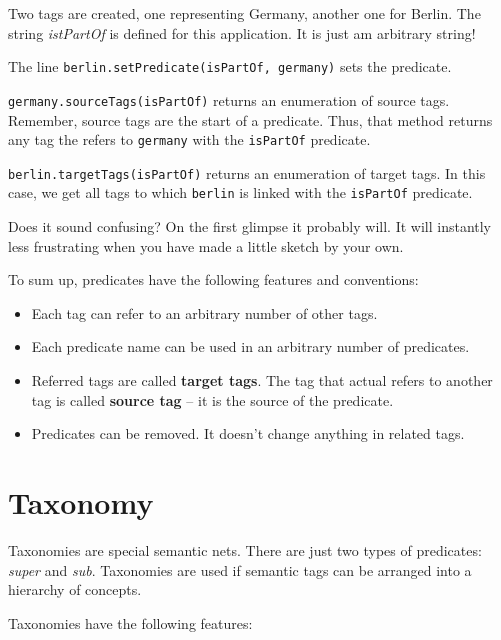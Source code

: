 Two tags are created, one representing Germany, another one for Berlin. The string {\it istPartOf} is defined for this application. It is just am arbitrary string!

The line {\verb|berlin.setPredicate(isPartOf, germany)|} sets the predicate.

{\verb|germany.sourceTags(isPartOf)|} returns an enumeration of source tags.
Remember, source tags are the start of a predicate. Thus, that method returns any tag the refers to {\tt germany} with the {\tt isPartOf} predicate.

{\verb|berlin.targetTags(isPartOf)|} returns an enumeration of target tags.
In this case, we get all tags to which {\tt berlin} is linked with the {\tt isPartOf} predicate.

Does it sound confusing? On the first glimpse it probably will. It will instantly less frustrating when you have made a little sketch by your own.

To sum up, predicates have the following features and conventions:

\begin{itemize}

\item Each tag can refer to an arbitrary number of other tags.

\item
Each predicate name can be used in an arbitrary number of predicates.

\item
Referred tags are called {\bf target tags}. The tag that actual refers to another tag is called {\bf source tag} -- it is the source of the predicate.

\item
Predicates can be removed. It doesn't change anything in related tags.

\end{itemize}

\section{Taxonomy}
Taxonomies are special semantic nets. There are just two types of predicates:
{\it super} and {\it sub}. Taxonomies are used if semantic tags can be arranged into a hierarchy of concepts.

Taxonomies have the following features:

